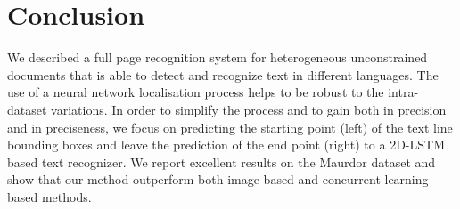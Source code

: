 \documentclass[conference]{IEEEtran}
\begin{document}


\section{Conclusion}
We described a full page recognition system for heterogeneous unconstrained documents that is able to detect and recognize text in different languages. The use of a neural network localisation process helps to be robust to the intra-dataset variations. In order to simplify the process and to gain both in precision and in preciseness, we focus on predicting the starting point (left) of the text line bounding boxes and leave the prediction of the end point (right)  to a 2D-LSTM based text recognizer. We report excellent results on the Maurdor dataset and show that our method outperform both image-based and concurrent learning-based methods.

\clearpage
\end{document}

